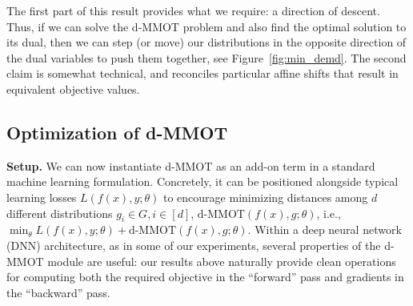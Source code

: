 \begin{remark} The first part of this result provides what we require: a direction of descent. 
Thus, if we can solve the d-MMOT problem and also find the optimal solution to its dual, 
then we can step (or move) our distributions in the opposite direction of the dual variables
to push them together, see Figure~\ref{fig:min_demd}.
The second claim is somewhat technical, and reconciles particular affine shifts that result in equivalent objective values.
\end{remark}

{\color{blue} 
\subsection{Optimization of d-MMOT}\label{sec:dual}

{\bf Setup.} 
We can now instantiate d-MMOT as an add-on term in a standard machine learning formulation. Concretely, it can be positioned alongside typical learning losses $L(f(x),y;\theta)$ to encourage minimizing distances among $d$ different distributions $g_i\in G, i \in [d]$, $\text{d-MMOT}(f(x),g;\theta)$, i.e., 
$\min_{\theta} L(f(x),y;\theta) + \text{d-MMOT}(f(x),g;\theta)$. 
Within a deep neural network (DNN) architecture, as in some of our experiments,  
several properties of the d-MMOT module are useful:
our results above naturally provide clean operations for computing both the required objective in the ``forward'' pass and gradients in the ``backward'' pass.
}


